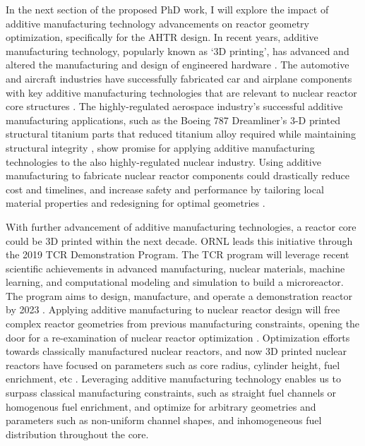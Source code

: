 In the next section of the proposed PhD work, I will explore the impact of 
additive manufacturing technology advancements on reactor geometry
optimization, specifically for the \gls{AHTR} design.
In recent years, additive manufacturing technology, popularly known as `3D printing', 
has advanced and altered the manufacturing and design of engineered hardware
\cite{simpson_considerations_2019}. 
The automotive and aircraft industries have successfully fabricated car and 
airplane components with key additive manufacturing technologies that are 
relevant to nuclear reactor core structures \cite{murr_frontiers_2016}.  
The highly-regulated aerospace industry's successful additive manufacturing 
applications, such as the Boeing 787 Dreamliner's 3-D printed structural titanium 
parts that reduced titanium alloy required while maintaining structural integrity
\cite{noauthor_printed_2017}, show promise for applying additive manufacturing 
technologies to the also highly-regulated nuclear industry.  
Using additive manufacturing to fabricate nuclear reactor components could 
drastically reduce cost and timelines, and increase safety and performance by 
tailoring local material properties and redesigning for optimal geometries
\cite{simpson_considerations_2019}. 

With further advancement of additive manufacturing technologies, a reactor 
core could be 3D printed within the next decade. 
\gls{ORNL} leads this initiative through the 2019 \gls{TCR} Demonstration 
Program. 
The \gls{TCR} program will leverage recent scientific achievements in advanced 
manufacturing, nuclear materials, machine learning, and computational modeling 
and simulation to build a microreactor. 
The program aims to design, manufacture, and operate a demonstration reactor 
by 2023 \cite{terrani_transformational_2019}. 
Applying additive manufacturing to nuclear reactor design will free complex 
reactor geometries from previous manufacturing constraints,
opening the door for a re-examination of nuclear reactor optimization 
\cite{sobes_artificial_2020}. 
Optimization efforts towards classically manufactured nuclear reactors, and now
3D printed nuclear reactors have focused on parameters such as core radius, 
cylinder height, fuel enrichment, etc 
\cite{sobes_artificial_2020,sacco_two_2006,kumar_new_2015,pereira_parallel_2008}. 
Leveraging additive manufacturing technology enables us to surpass classical 
manufacturing constraints, such as straight fuel channels or homogenous fuel 
enrichment, and optimize for arbitrary geometries and parameters 
such as non-uniform channel shapes, and inhomogeneous fuel distribution 
throughout the core. 

